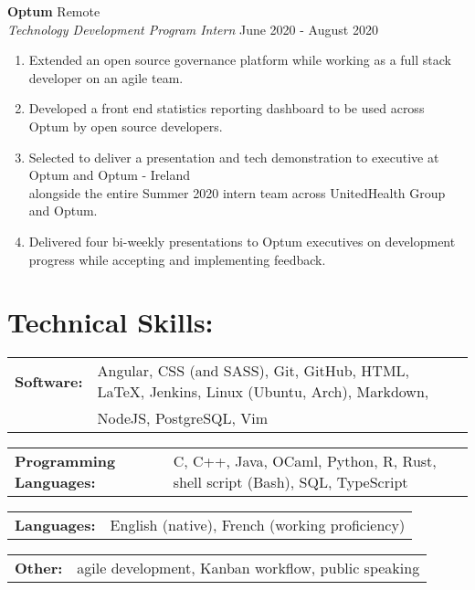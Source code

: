 \documentclass[10pt]{article}
\begin{document}
		\noindent
		\textbf{Optum} \hfill Remote \\
		\textit{Technology Development Program Intern} \hfill June 2020 - August 2020
		\begin{enumerate}[label=--]
			\item Extended an open source governance platform while working as a full stack developer on an agile team.
			\item Developed a front end statistics reporting dashboard to be used across Optum by open source developers.
			\item Selected to deliver a presentation and tech demonstration to executive at Optum and Optum - Ireland \\ alongside the entire Summer 2020 intern team across UnitedHealth Group and Optum.
			\item Delivered four bi-weekly presentations to Optum executives on development progress while accepting and implementing feedback.
		\end{enumerate}
		
	\section*{Technical Skills: \hrulefill}
		\begin{tabular}{@{}l@{\ }l}
		\textbf{Software: } & Angular, CSS (and SASS), Git, GitHub, HTML, {\large \LaTeX}, Jenkins, Linux (Ubuntu, Arch), Markdown,\\ & NodeJS, PostgreSQL, Vim
		\end{tabular}
		
		\vspace{5pt}
		\noindent
		\begin{tabular}{@{}l@{\ }l}
		\textbf{Programming Languages: } & C, C++, Java, OCaml, Python, R, Rust, shell script (Bash), SQL, TypeScript\\
		\end{tabular}
		
		\vspace{5pt}
		\noindent
		\begin{tabular}{@{}l@{\ }l}
		\textbf{Languages: } & English (native), French (working proficiency) \\
		\end{tabular}
		
		\vspace{5pt}
		\noindent
		\begin{tabular}{@{}l@{\ }l}
		\textbf{Other: } &  agile development, Kanban workflow, public speaking \\
		\end{tabular}
			
\end{document}
